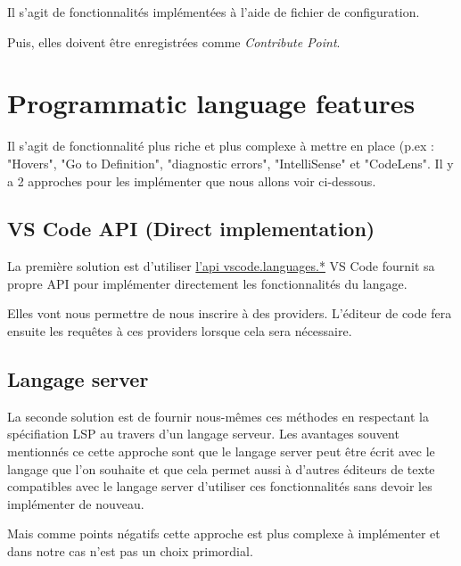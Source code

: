 \documentclass[
    iict, %
    il, %
]{heig-tb}
\begin{document}
Il s'agit de fonctionnalités implémentées à l'aide de fichier de configuration.

Puis, elles doivent être enregistrées comme \emph{Contribute Point}.

\section{Programmatic language features}\label{Programmatic language features}
Il s'agit de fonctionnalité plus riche et plus complexe à mettre en place (p.ex : "Hovers", "Go to Definition", "diagnostic errors", "IntelliSense" \space et "CodeLens".
Il y a 2 approches pour les implémenter que nous allons voir ci-dessous.

\subsection{VS Code API (Direct implementation)}
La première solution est d'utiliser \href{https://code.visualstudio.com/api/references/vscode-api#languages}{l'api vscode.languages.*}
VS Code fournit sa propre API pour implémenter directement les fonctionnalités du langage.

Elles vont nous permettre de nous inscrire à des providers. L'éditeur de code fera ensuite les requêtes à ces providers lorsque cela sera nécessaire.


\subsection{Langage server}


La seconde solution est de fournir nous-mêmes ces méthodes en respectant la spécifiation LSP \cite{lsp-specification} au travers d'un langage serveur.
Les avantages souvent mentionnés ce cette approche sont que le langage server peut être écrit avec le langage que l'on souhaite et
que cela permet aussi à d'autres éditeurs de texte compatibles avec le langage server d'utiliser ces fonctionnalités sans devoir les implémenter de nouveau.

Mais comme points négatifs cette approche est plus complexe à implémenter et dans notre cas n'est pas un choix primordial.
\end{document}
